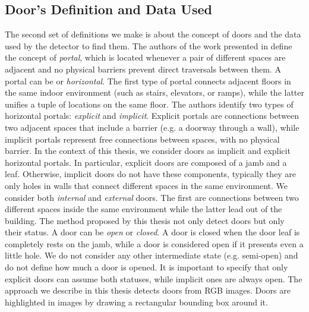 \subsection{Door's Definition and Data Used} 

The second set of definitions we make is about the concept of doors and the data used by the detector to find them. The authors of the work presented in \cite{topologyurban} define the concept of \textit{portal}, which is located whenever a pair of different spaces are adjacent and no physical barriers prevent direct traversals between them.  A portal can be  or \textit{horizontal}. The first type of portal connects adjacent floors in the same indoor environment (such as stairs, elevators, or ramps), while the latter unifies a tuple of locations on the same floor. The authors identify two types of horizontal portals: \textit{explicit} and \textit{implicit}. Explicit portals are connections between two adjacent spaces that include a barrier (e.g. a doorway through a wall), while implicit portals represent free connections between spaces, with no physical barrier. In the context of this thesis, we consider doors as implicit and explicit horizontal portals. In particular, explicit doors are composed of a jamb and a leaf. Otherwise, implicit doors do not have these components, typically they are only holes in walls that connect different spaces in the same environment. We consider both \textit{internal} and \textit{external} doors. The first are connections between two different spaces inside the same environment while the latter lead out of the building. The method proposed by this thesis not only detect doors but only their status. A door can be \textit{open} or \textit{closed}. A door is closed when the door leaf is completely rests on the jamb, while a door is considered open if it presents even a little hole. We do not consider any other intermediate state (e.g. semi-open) and do not define how much a door is opened. It is important to specify that only explicit doors can assume both statuses, while implicit ones are always open. The approach we describe in this thesis detects doors from RGB images. Doors are highlighted in images by drawing a rectangular bounding box around it.

